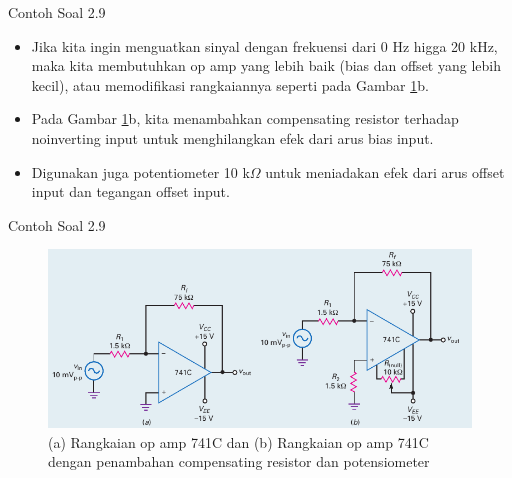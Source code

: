 \begin{frame}{Contoh Soal 2.9}
	\begin{itemize}
		\item Jika kita ingin menguatkan sinyal dengan frekuensi dari 0 Hz higga 20 kHz, maka kita membutuhkan op amp yang lebih baik (bias dan offset yang lebih kecil), atau memodifikasi rangkaiannya seperti pada Gambar \ref{fig-16.17}b.
		\item Pada Gambar \ref{fig-16.17}b, kita menambahkan compensating resistor terhadap noinverting input untuk menghilangkan efek dari arus bias input.
		\item Digunakan juga potentiometer 10 k$\Omega$ untuk meniadakan efek dari arus offset input dan tegangan offset input.
	\end{itemize}
\end{frame}

\begin{frame}{Contoh Soal 2.9}
	\begin{figure}
		\centering
		\includegraphics[width=0.8\linewidth]{gambar/fig-16.17}
		\caption{(a) Rangkaian op amp 741C dan (b) Rangkaian op amp 741C dengan penambahan compensating resistor dan potensiometer}
		\label{fig-16.17}
	\end{figure}
	
\end{frame}